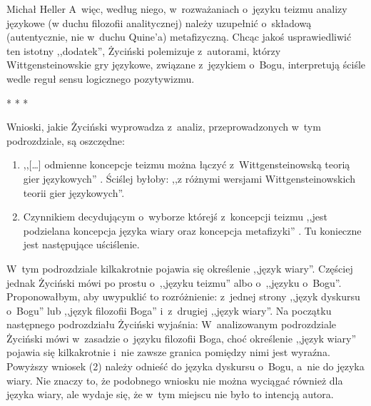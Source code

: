 \begin{artplenv}{Michał Heller}
A~więc, według niego, w~rozważaniach o~języku teizmu analizy językowe (w duchu filozofii analitycznej) należy uzupełnić o~składową (autentycznie, nie w~duchu Quine'a) metafizyczną. Chcąc jakoś usprawiedliwić ten istotny ,,dodatek'', Życiński polemizuje z~autorami, którzy Wittgensteinowskie gry językowe, związane z~językiem o~Bogu, interpretują ściśle wedle reguł sensu logicznego pozytywizmu.


\begin{center}
* * *
\end{center}


Wnioski, jakie Życiński wyprowadza z~analiz, przeprowadzonych w~tym podrozdziale, są oszczędne:

\begin{enumerate}
\item ,,[\ldots] odmienne koncepcje teizmu można łączyć z~Wittgensteinowską teorią gier językowych''
\parencite[][s.~22]{zycinski_teizm_1985}. %
 Ściślej byłoby: ,,z różnymi wersjami Wittgensteinowskich teorii gier językowych''.
\item Czynnikiem decydującym o~wyborze którejś z~koncepcji teizmu ,,jest podzielana koncepcja języka wiary oraz koncepcja metafizyki''
\parencite[][s.~22]{zycinski_teizm_1985}. %
 Tu konieczne jest następujące uściślenie.
\end{enumerate}
W~tym podrozdziale kilkakrotnie pojawia się określenie ,,język wiary''. Częściej jednak Życiński mówi po prostu o~,,języku teizmu'' albo o~,,języku o~Bogu''. Proponowałbym, aby uwypuklić to rozróżnienie: z~jednej strony ,,język dyskursu o~Bogu'' lub ,,język filozofii Boga'' i~z~drugiej ,,język wiary''. Na początku następnego podrozdziału Życiński wyjaśnia: 
 W~analizowanym podrozdziale Życiński mówi w~zasadzie o~języku filozofii Boga, choć określenie ,,język wiary'' pojawia się kilkakrotnie i~nie zawsze granica pomiędzy nimi jest wyraźna. Powyższy wniosek (2) należy odnieść do języka dyskursu o~Bogu, a~nie do języka wiary. Nie znaczy to, że podobnego wniosku nie można wyciągać również dla języka wiary, ale wydaje się, że w~tym miejscu nie było to intencją autora.


\end{artplenv}

